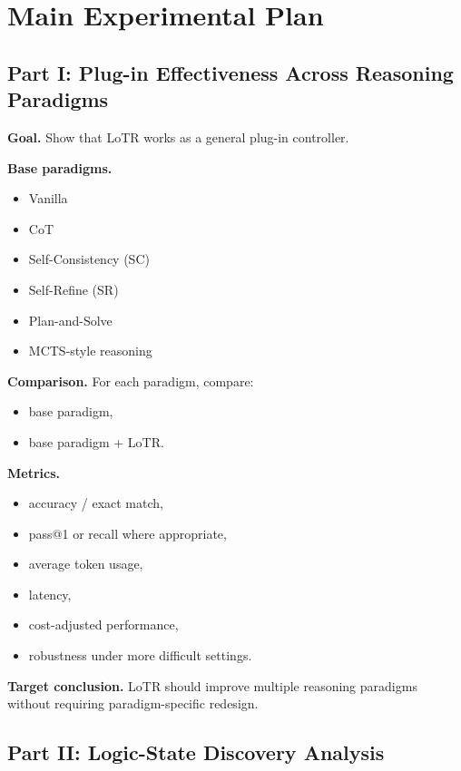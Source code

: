 \documentclass[11pt]{article}
\begin{document}
\section{Main Experimental Plan}

\subsection{Part I: Plug-in Effectiveness Across Reasoning Paradigms}

\textbf{Goal.} Show that LoTR works as a general plug-in controller.

\textbf{Base paradigms.}
\begin{itemize}[leftmargin=1.5em]
    \item Vanilla
    \item CoT
    \item Self-Consistency (SC)
    \item Self-Refine (SR)
    \item Plan-and-Solve
    \item MCTS-style reasoning
\end{itemize}

\textbf{Comparison.}
For each paradigm, compare:
\begin{itemize}[leftmargin=1.5em]
    \item base paradigm,
    \item base paradigm + LoTR.
\end{itemize}

\textbf{Metrics.}
\begin{itemize}[leftmargin=1.5em]
    \item accuracy / exact match,
    \item pass@1 or recall where appropriate,
    \item average token usage,
    \item latency,
    \item cost-adjusted performance,
    \item robustness under more difficult settings.
\end{itemize}

\textbf{Target conclusion.}
LoTR should improve multiple reasoning paradigms without requiring paradigm-specific redesign.

\subsection{Part II: Logic-State Discovery Analysis}
\end{document}
